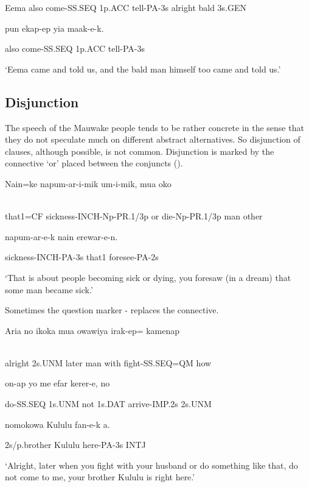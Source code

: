 Eema  also  come-SS.SEQ  1p.ACC  tell-PA-3s  alright  bald  3s.GEN

pun  ekap-ep  yia  maak-e-k.

also  come-SS.SEQ  1p.ACC  tell-PA-3s

`Eema came and told us, and the bald man himself too came and told us.'

\subsection{Disjunction}
\hypertarget{RefHeading23001935131865}{}
The speech of the Mauwake people tends to be rather concrete in the sense that they do not speculate much on different abstract alternatives. So disjunction of clauses, although possible, is not common. Disjunction is marked by the connective  `or' placed between the conjuncts (). 

\ea%
\label{ex:x1385}
\gll Nain=ke  napum-ar-i-mik    um-i-mik,  mua  oko  \\
      \\
\glt
\z

that1=CF  sickness-INCH-Np-PR.1/3p  or  die-Np-PR.1/3p  man  other

napum-ar-e-k  nain  erewar-e-n.

sickness-INCH-PA-3s  that1  foresee-PA-2s

`That is about people becoming sick or dying, you foresaw (in a dream) that some man became sick.'

Sometimes the question marker -  replaces the connective.

\ea%
\label{ex:x1387}
\gll Aria  no  ikoka  mua  owawiya  irak-ep=  kamenap  \\
      \\
\glt
\z

alright  2s.UNM  later  man  with  fight-SS.SEQ=QM  how

on-ap  yo  me  efar  kerer-e,  no

do-SS.SEQ  1s.UNM  not  1s.DAT  arrive-IMP.2s  2s.UNM

nomokowa  Kululu  fan-e-k  a.

2s/p.brother  Kululu  here-PA-3s  INTJ

`Alright, later when you fight with your husband or do something like that, do not come to me, your brother Kululu is right here.'

